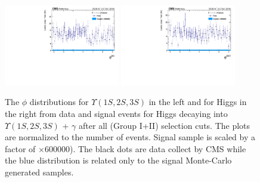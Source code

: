 \begin{figure}[!htbp]
\begin{center}
\includegraphics[width=0.45\textwidth]{figures_and_tables/outputPlots/HtoUpsilon_Cat0_ZZZZZ/nEvts/data_x_mc/withKinCuts/h_withKin_Upsilon_phi}\hspace*{1.cm}
\includegraphics[width=0.45\textwidth]{figures_and_tables/outputPlots/HtoUpsilon_Cat0_ZZZZZ/nEvts/data_x_mc/withKinCuts/h_withKin_Z_phi}
\end{center}\vspace*{-.5cm}
\caption{The $\phi$ distributions for $\Upsilon(1S,2S,3S)$ in the left and for Higgs in the right from data and signal events for Higgs decaying into $\Upsilon(1S,2S,3S)$ + $\gamma$ after all (Group I+II) selection cuts. The plots are normalized to the number of events. Signal sample is scaled by a factor of $\times 600000$). The black dots are data collect by CMS while the blue distribution is related only to the signal Monte-Carlo generated samples.}
\label{fig:phiUpsilon_and_Higgs_HtoUpsilon_Cat0_groupI_plus_II}
\end{figure}


